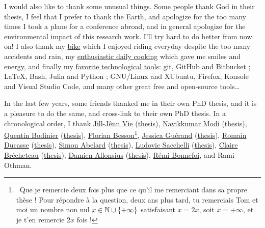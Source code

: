 \begin{acknowledgements}
I would also like to thank some unusual things. Some people thank God in their thesis, I feel that I prefer to thank the Earth, and apologize for the too many times I took a plane for a conference abroad, and in general apologize for the environmental impact of this research work. I'll try hard to do better from now on!
I also thank my \href{https://perso.crans.org/besson/zero-dechet/}{bike} which I enjoyed riding everyday despite the too many accidents and rain, my \href{https://perso.crans.org/besson/cuisine/}{enthusiastic daily cooking} which gave me smiles and energy, and finally my \href{https://perso.crans.org/besson/}{favorite technological tools}: git, GitHub and Bitbucket ; \LaTeX, Bash, Julia and Python ; GNU/Linux and XUbuntu, Firefox, Konsole and Visual Studio Code, and many other great free and open-source tools\ldots{}


In the last few years, some friends thanked me in their own PhD thesis, and it is a pleasure to do the same, and cross-link to their own PhD thesis.
In a chronological order, I thank
\href{http://jill-jenn.net/}{Jill-Jênn Vie} (\href{https://github.com/jilljenn/phd}{thesis}), \href{https://navikkumarmodi.wordpress.com/}{Navikkumar Modi} (\href{https://tel.archives-ouvertes.fr/tel-01668536/document}{thesis}), \href{https://quentinbodinier.wordpress.com/}{Quentin Bodinier} (\href{https://tel.archives-ouvertes.fr/tel-01731022/document}{thesis}), \href{https://paris-sorbonne.academia.edu/FBesson}{Florian Besson}\footnote{~Que je remercie deux fois plus que ce qu'il me remerciant dans sa propre thèse ! Pour répondre à la question, deux ans plus tard, tu remerciais Tom et moi un nombre non nul $x\in\mathbb{N}\cup\{+\infty\}$ satisfaisant $x=2x$, soit $x=+\infty$, et je t'en remercie $2x$ fois !}, \href{https://sites.google.com/view/guerand}{Jessica Guérand} (\href{https://www.theses.fr/s175725}{the}\href{https://www.theses.fr/s175725}{sis}), \href{https://sites.google.com/view/ducasse/}{Romain Ducasse} (\href{https://drive.google.com/open?id=1u2oxRRimcO0jQfuYwSVwgKfcHU5DdoPK}{thesis}), \href{https://members.loria.fr/SAbelard/}{Simon Abelard} (\href{https://members.loria.fr/SAbelard/theseabelard.pdf}{thesis}), \href{http://www.cmap.polytechnique.fr/~sacchelli/}{Ludovic Sacchelli} (\href{https://tel.archives-ouvertes.fr/tel-01893068/document}{thesis}), \href{http://pages.saclay.inria.fr/claire.brecheteau/}{Claire Brécheteau} (\href{https://hal.archives-ouvertes.fr/tel-01897787/document}{thesis}), \href{http://www.i2m.univ-amu.fr/perso/damien.allonsius/}{Damien Allonsius} (\href{http://www.i2m.univ-amu.fr/perso/damien.allonsius/documents/recherche/these/Main.pdf}{thesis}), \href{https://remibonnefoi.wordpress.com/}{Rémi Bonnefoi}, and Rami Othman.



\end{acknowledgements}
